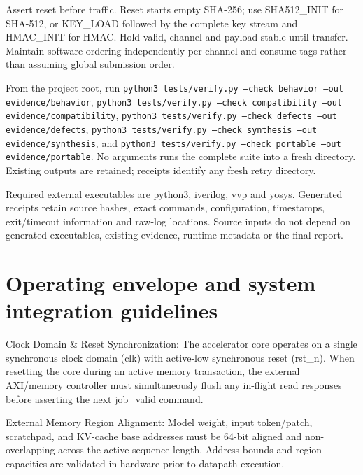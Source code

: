 \documentclass[11pt,a4paper]{article}
\begin{document}
Assert reset before traffic. Reset starts empty SHA-256; use SHA512\_\allowbreak{}INIT for SHA-512,\allowbreak{} or KEY\_\allowbreak{}LOAD followed by the complete key stream and HMAC\_\allowbreak{}INIT for HMAC. Hold valid,\allowbreak{} channel and payload stable until transfer. Maintain software ordering independently per channel and consume tags rather than assuming global submission order.


From the project root,\allowbreak{} run \texttt{python3 tests/\allowbreak{}verify.py --check behavior --out evidence/\allowbreak{}behavior},\allowbreak{} \texttt{python3 tests/\allowbreak{}verify.py --check compatibility --out evidence/\allowbreak{}compatibility},\allowbreak{} \texttt{python3 tests/\allowbreak{}verify.py --check defects --out evidence/\allowbreak{}defects},\allowbreak{} \texttt{python3 tests/\allowbreak{}verify.py --check synthesis --out evidence/\allowbreak{}synthesis},\allowbreak{} and \texttt{python3 tests/\allowbreak{}verify.py --check portable --out evidence/\allowbreak{}portable}. No arguments runs the complete suite into a fresh directory. Existing outputs are retained; receipts identify any fresh retry directory.


Required external executables are python3,\allowbreak{} iverilog,\allowbreak{} vvp and yosys. Generated receipts retain source hashes,\allowbreak{} exact commands,\allowbreak{} configuration,\allowbreak{} timestamps,\allowbreak{} exit/\allowbreak{}timeout information and raw-log locations. Source inputs do not depend on generated executables,\allowbreak{} existing evidence,\allowbreak{} runtime metadata or the final report.


\section{Operating envelope and system integration guidelines}

Clock Domain \& Reset Synchronization: The accelerator core operates on a single synchronous clock domain (\allowbreak{}clk)\allowbreak{} with active-low synchronous reset (\allowbreak{}rst\_\allowbreak{}n)\allowbreak{}. When resetting the core during an active memory transaction,\allowbreak{} the external AXI/\allowbreak{}memory controller must simultaneously flush any in-flight read responses before asserting the next job\_\allowbreak{}valid command.


External Memory Region Alignment: Model weight,\allowbreak{} input token/\allowbreak{}patch,\allowbreak{} scratchpad,\allowbreak{} and KV-cache base addresses must be 64-bit aligned and non-overlapping across the active sequence length. Address bounds and region capacities are validated in hardware prior to datapath execution.
\end{document}
